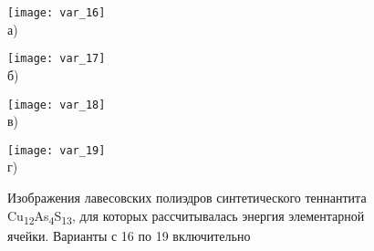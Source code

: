 \begin{figure}[p!]
  \begin{minipage}[ht]{0.45\linewidth}\centering
    \texttt{[image: var\_16]} \\ а)
  \end{minipage}
						\hfill
 \begin{minipage}[ht]{0.45\linewidth}\centering
    \texttt{[image: var\_17]} \\ б)
  \end{minipage}
\vfill

  \begin{minipage}[ht]{0.45\linewidth}\centering
    \texttt{[image: var\_18]} \\ в)
  \end{minipage}
						\hfill
 \begin{minipage}[ht]{0.45\linewidth}\centering
    \texttt{[image: var\_19]} \\ г)
  \end{minipage}
\vfill

  \begin{minipage}[ht]{0.45\linewidth}\centering

  \end{minipage}
						\hfill
 \begin{minipage}[ht]{0.45\linewidth}\centering

  \end{minipage}
      \caption[Изображения лавесовских полиэдров синтетического теннантита Cu\textsubscript{12}As\textsubscript{4}S\textsubscript{13}, для которых рассчитывалась энергия элементарной ячейки. Варианты с 16 по 19 включительно]{Изображения лавесовских полиэдров синтетического теннантита Cu\textsubscript{12}As\textsubscript{4}S\textsubscript{13}, для которых рассчитывалась энергия элементарной ячейки. Варианты с 16 по 19 включительно}
    \label{img:laves4}
\end{figure}



\newpage

\clearpage
